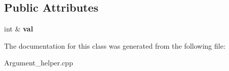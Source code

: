 \subsection*{Public Attributes}
\begin{DoxyCompactItemize}
\item 
\hypertarget{classdsr_1_1_argument__helper_1_1_int_target_a36998950d2fcfd87c92573d3f8706852}{
int \& {\bfseries val}}
\label{classdsr_1_1_argument__helper_1_1_int_target_a36998950d2fcfd87c92573d3f8706852}

\end{DoxyCompactItemize}


The documentation for this class was generated from the following file:\begin{DoxyCompactItemize}
\item 
Argument\_\-helper.cpp\end{DoxyCompactItemize}
